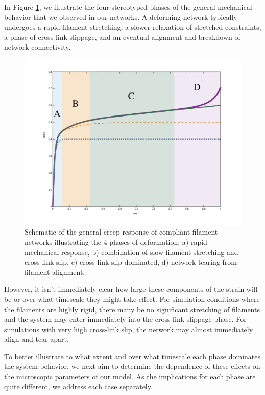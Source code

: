\documentclass[pre,preprint]{revtex4-1}
\begin{document}
In Figure \ref{fig:shear_modes}, we illustrate the four stereotyped phases of the general mechanical behavior that we observed in our networks.  A deforming network typically undergoes a rapid filament stretching, a slower relaxation of stretched constraints, a phase of cross-link slippage, and an eventual alignment and breakdown of network connectivity.

\begin{figure}[h!]
\centering
\includegraphics[width=\hsize]{shear_modes}
\caption{\label{fig:shear_modes}Schematic of the general creep response of compliant filament networks illustrating the 4 phases of deformation: a) rapid mechanical response, b) combination of slow filament stretching and cross-link slip, c) cross-link slip dominated, d) network tearing from filament alignment.}
\end{figure}

However, it isn't immediately clear how large these components of the strain will be or over what timescale they might take effect.  For simulation conditions where the filaments are highly rigid, there many be no significant stretching of filaments and the system may enter immediately into the cross-link slippage phase.  For simulations with very high cross-link slip, the network may almost immediately align and tear apart.

To better illustrate to what extent and over what timescale each phase dominates the system behavior, we next aim to determine the dependence of these effects on the microscopic parameters of our model.  As the implications for each phase are quite different, we address each case separately.
\end{document}
